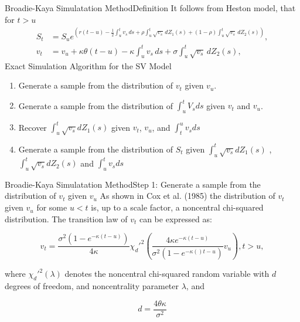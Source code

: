 \begin{frame}{Broadie-Kaya Simulatation Method}{Definition}
    It follows from Heston model, that for $t > u$
    \begin{align}
         S_t &= S_u e^{\left( r(t-u)-\frac{1}{2} \int_{u}^{t} v_s \, ds  + \rho\int_{u}^{t} \sqrt{v_s} \, dZ_1(s) + (1-\rho)\int_{u}^{t} \sqrt{v_s} \, dZ_2(s)  \right)}, \label{BK:Price_int} \\
         v_t &= v_u + \kappa\theta(t-u) - \kappa \int_{u}^{t} v_s \, ds + \sigma\int_{u}^{t} \sqrt{v_s} \, dZ_2(s), \label{BK:Vol_int}
    \end{align}
    Exact Simulation Algorithm for the SV Model
    \begin{enumerate}
        \item[Step 1] Generate a sample from the distribution of $v_t$ given $v_u$.
        \item[Step 2] Generate a sample from the distribution of $\int_{u}^t V_s ds$ given $v_t$ and $v_u$.
        \item[Step 3] Recover $\int_{u}^t \sqrt{v_s} dZ_1(s)$ given $v_t$, $v_u$, and
        $\int_{t}^u v_s ds$
        \item[Step 4] Generate a sample from the distribution of $S_t$ given $\int_{u}^t \sqrt{v_s} dZ_1(s)$ , $\int_{u}^t \sqrt{v_s} dZ_2(s)$ and $\int_{u}^t v_s ds$
    \end{enumerate}
\end{frame}

\begin{frame}{Broadie-Kaya Simulatation Method}{Step 1: Generate a sample from the distribution of $v_t$ given $v_u$}
    As shown in Cox et al. (1985) the distribution of $v_t$ given $v_u$ for some $u < t$ is, up to a scale factor, a noncentral chi-squared distribution. The transition law of $v_t$ can be expressed as:

    \begin{equation}
        v_t = \frac{\sigma^2(1-e^{-\kappa(t-u)})}{4\kappa}\chi_d'^{2}\left(\frac{4\kappa e^{-\kappa(t-u)}}{\sigma^2(1-e^{-\kappa()t-u})} v_u  \right), t > u , \label{BK:vol_law}
    \end{equation}

    where $\chi_d'^{2}(\lambda)$ denotes the noncentral chi-squared random
    variable with $d$ degrees of freedom, and noncentrality
    parameter $\lambda$, and

    \begin{equation}
        d = \frac{4\theta\kappa}{\sigma^2} \label{BK:vol_law:parameter}
    \end{equation}
    
\end{frame}


